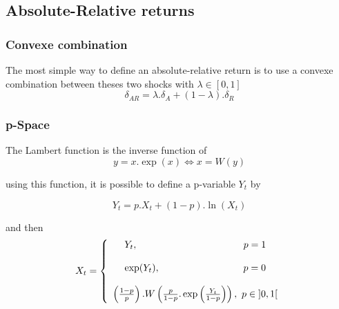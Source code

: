 \documentclass[3pt]{article}
\begin{document}
\subsection{Absolute-Relative returns}

\bigskip

\subsubsection{Convexe combination}

The most simple way to define an absolute-relative return is to use a
convexe combination between theses two shocks with $\lambda \in \left[ 0,1%
\right] $ 
\begin{equation*}
\delta _{AR}=\lambda .\delta _{A}+(1-\lambda ).\delta _{R}
\end{equation*}

\subsubsection{p-Space}

\bigskip

\bigskip

\bigskip

The Lambert function is the inverse function of 
\begin{equation*}
y=x.\exp (x)\Longleftrightarrow x=W(y)
\end{equation*}

\bigskip using this function, it is possible to define a p-variable $Y_{t}$
by

\bigskip

\begin{equation*}
Y_{t}=p.X_{t}+(1-p).\ln (X_{t})
\end{equation*}

and then%
\begin{equation*}
X_{t}=\left\{ 
\begin{array}{c}
Y_{t},\text{ \ \ \ \ \ \ \ \ \ \ \ \ \ \ \ \ \ \ \ \ \ \ \ \ \ \ \ \ \ \ \ \ 
}p=1 \\ 
\\ 
\exp (Y_{t}),\text{ \ \ \ \ \ \ \ \ \ \ \ \ \ \ \ \ \ \ \ \ \ \ \ \ \ }p=0
\\ 
\\ 
\left( \frac{1-p}{p}\right) .W\left( \frac{p}{1-p}.\exp \left( \frac{Y_{t}}{%
1-p}\right) \right) ,\text{ }p\in \left] 0,1\right[%
\end{array}%
\right.
\end{equation*}
\end{document}
